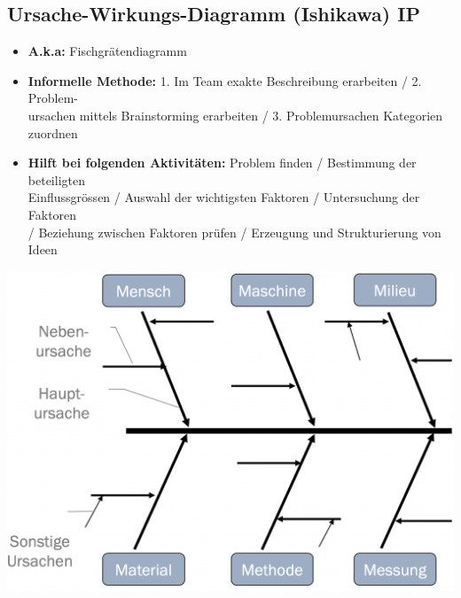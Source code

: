 \subsection{Ursache-Wirkungs-Diagramm (Ishikawa) \hfill IP}
    \begin{scriptsize}
        \begin{itemize}
            \item \textbf{A.k.a:} Fischgrätendiagramm
            \item \textbf{Informelle Methode:} 1. Im Team exakte Beschreibung erarbeiten / 2. Problem-\\ursachen mittels Brainstorming erarbeiten / 3. Problemursachen Kategorien \\zuordnen
            \item \textbf{Hilft bei folgenden Aktivitäten:} Problem finden / Bestimmung der beteiligten \\Einflussgrössen / Auswahl der wichtigsten Faktoren / Untersuchung der Faktoren \\/ Beziehung zwischen Faktoren prüfen / Erzeugung und Strukturierung von Ideen
        \end{itemize}
    \end{scriptsize}
        \includegraphics[width = 0.5\linewidth]{MAEIP_Fischgraeten}